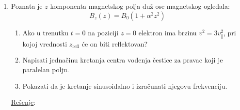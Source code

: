 \documentclass[fleqn]{report}
\begin{document}
\begin{enumerate}
          \hrulefill
    \item Poznata je $z$ komponenta magnetskog polja duž ose magnetskog ogledala: \[ B_z (z) = B_0 (1 + \alpha^2 z^2) \]
          \begin{enumerate}
              \item Ako u trenutku $t = 0$ na poziciji $z = 0$ elektron ima brzinu $v^2 = 3v_\parallel^2$, pri kojoj vrednosti $z_\text{refl}$ će on biti reflektovan?
              \item Napisati jednačinu kretanja centra vođenja čestice za pravac koji je paralelan polju.
              \item Pokazati da je kretanje sinusoidalno i izračunati njegovu frekvenciju.
          \end{enumerate}

          \underline{Rešenje}:


\end{enumerate}
\end{document}
